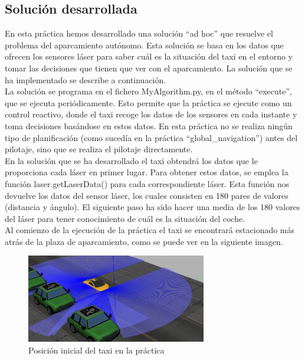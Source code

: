 \subsection{Solución desarrollada}
En esta práctica hemos desarrollado una solución ``ad hoc'' que resuelve el problema del aparcamiento autónomo. Esta solución se basa en los datos que ofrecen los sensores láser para saber cuál es la situación del taxi en el entorno y tomar las decisiones que tienen que ver con el aparcamiento. La solución que se ha implementado se describe a continuación.\\

La solución se programa en el fichero MyAlgorithm.py, en el método ``execute'', que se ejecuta periódicamente. Esto permite que la práctica se ejecute como un control reactivo, donde el taxi recoge los datos de los sensores en cada instante y toma decisiones basándose en estos datos. En esta práctica no se realiza ningún tipo de planificación (como sucedía en la práctica ``global\_navigation'') antes del pilotaje, sino que se realiza el pilotaje directamente.\\

En la solución que se ha desarrollado el taxi obtendrá los datos que le proporciona cada láser en primer lugar. Para obtener estos datos, se emplea la función laser.getLaserData() para cada correspondiente láser. Esta función nos devuelve los datos del sensor láser, los cuales consisten en 180 pares de valores (distancia y ángulo). El siguiente paso ha sido hacer una media de los 180 valores del láser para tener conocimiento de cuál es la situación del coche. \\

Al comienzo de la ejecución de la práctica el taxi se encontrará estacionado más atrás de la plaza de aparcamiento, como se puede ver en la siguiente imagen.\\

\begin{figure}[H]
  \begin{center}
    \includegraphics[width=0.7\textwidth]{figures/Autopark/Posicion1.png}
		\caption{Posición inicial del taxi en la práctica}
		\label{fig.Posicion1}
		\end{center}
\end{figure}

